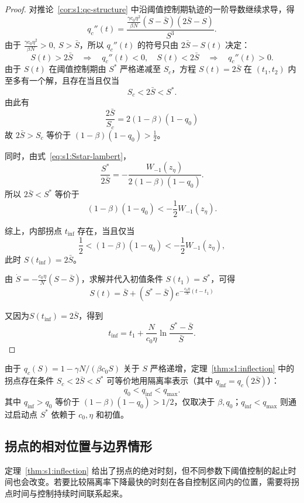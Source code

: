 \documentclass[lang=cn,a4paper,newtx]{elegantpaper}
\numberwithin{equation}{section}
\theoremstyle{plain}
\newcommand{\qinf}{q_{\mathrm{inf}}}
\begin{document}
\begin{proof}
    对推论~\ref{cor:s1:qc-structure} 中沿阈值控制期轨迹的一阶导数继续求导，得
    \[
    q_c''(t)
    =
    \frac{\frac{\gamma c_0\eta^2}{\beta N}(S-\bar S)(2\bar S-S)}{S^3}.
    \]
    由于 \(\frac{\gamma c_0\eta^2}{\beta N}>0,\ S>\bar S\)，所以 $q_c''(t)$ 的符号只由 $2\bar S-S(t)$ 决定：
    \[
    S(t)>2\bar S
    \quad\Rightarrow\quad
    q_c''(t)<0,
    \quad S(t)<2\bar S
    \quad\Rightarrow\quad
    q_c''(t)>0.
    \]
    由于 $S(t)$ 在阈值控制期由 $S^*$ 严格递减至 $S_c$，方程 $S(t)=2\bar S$ 在 $(t_1,t_2)$ 内至多有一个解，且存在当且仅当
    \[
    S_c<2\bar S<S^*.
    \]
    由此有
    \[
    \frac{2\bar{S}}{S_c}=2(1-\beta)(1-q_0)
    \]
    故 $2\bar S>S_c$ 等价于 $(1-\beta)(1-q_0)>\frac{1}{2}$。
    
    同时，由式~\eqref{eq:s1:Sstar-lambert}，
    \[
    \frac{S^*}{2\bar S}
    =
    -\frac{W_{-1}(z_\eta)}
    {2(1-\beta)(1-q_0)}.
    \]
    所以 $2\bar S<S^*$ 等价于
    \[
    (1-\beta)(1-q_0)<-\frac{1}{2}W_{-1}(z_\eta).
    \]

    综上，内部拐点 $t_{\mathrm{inf}}$ 存在，当且仅当
    \[
    \frac{1}{2}
    <(1-\beta)(1-q_0)
    <-\frac{1}{2}W_{-1}(z_\eta),
    \]
    此时 $S(t_{\mathrm{inf}})=2\bar S$。
    
    由 $\dot{S}=-\frac{c_0\eta}{N}(S-\bar S)$，求解并代入初值条件 $S(t_1)=S^*$，可得
    \[
    S(t)=\bar S+(S^*-\bar S)
    e^{-\frac{c_0\eta}{N}(t-t_1)}
    \]

    又因为\(S(t_{\mathrm{inf}})=2\bar S\)，得到
    \[
    t_{\mathrm{inf}}
    =
    t_1+
    \frac{N}{c_0\eta}
    \ln\frac{S^*-\bar S}{\bar S}.
    \]
\end{proof}
由于 $q_c(S)=1-\gamma N/(\beta c_0 S)$ 关于 $S$ 严格递增，定理~\ref{thm:s1:inflection} 中的拐点存在条件 $S_c<2\bar S<S^*$ 可等价地用隔离率表示（其中 $\qinf=q_c(2\bar S)$）：
\begin{equation}
q_0<\qinf<q_{\max}.
\label{eq:s1:inflection-exist}
\end{equation}
其中 $\qinf>q_0$ 等价于 $(1-\beta)(1-q_0)>1/2$，仅取决于 $\beta,q_0$；$\qinf<q_{\max}$ 则通过启动点 $S^*$ 依赖于 $c_0,\eta$ 和初值。


\subsection{拐点的相对位置与边界情形}
\label{sec:s1:inflection-position}
定理~\ref{thm:s1:inflection} 给出了拐点的绝对时刻，但不同参数下阈值控制的起止时间也会改变。若要比较隔离率下降最快的时刻在各自控制区间内的位置，需要将拐点时间与控制持续时间联系起来。
\end{document}
